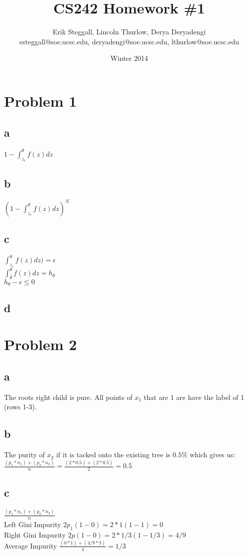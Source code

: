 \documentclass{article}
\title{CS242 Homework \#1}
\author{Erik Steggall, Lincoln Thurlow, Derya Deryadengi\\ esteggall@soe.ucsc.edu, deryadengi@soe.ucsc.edu, lthurlow@soe.ucsc.edu}
\date{Winter 2014}
\begin{document}
 \maketitle \pagestyle{empty}
\section*{Problem 1}
\subsection*{a}
$1- \int_{z_{\epsilon}}^\theta f(z) dz$\\

\subsection*{b}
$(1- \int_{z_{\epsilon}}^\theta f(z) dz)^N$\\
\subsection*{c}
$ \int_{z_{\epsilon}}^\theta f(z) dz) = \epsilon$\\
$ \int_{\hat{\theta}}^\theta f(z) dz = h_{\theta}$\\
$h_{\theta} - \epsilon \leq 0$\\
\subsection*{d}

\section*{Problem 2}
\subsection*{a}
The roots right child is pure. All points of $x_{1}$ that are 1 are have the label of 1 (rows 1-3).\\
\subsection*{b}
The purity of $x_{2}$ if it is tacked onto the existing tree is $0.5\%$ which gives us:\\
$ \frac{(p_{1}*n_{1}) + (p_{2}*n_{2})}{n} = \frac{(2*0.5) + (2*0.5)}{2} = 0.5$\\
\subsection*{c}
$ \frac{(p_{1}*n_{1}) + (p_{2}*n_{2})}{n} $\\
Left Gini Impurity $ 2p_{1}(1-0) = 2*1(1-1) = 0$\\
Right  Gini Impurity $2p(1-0) = 2*1/3(1-1/3) = 4/9$\\
Average Impurity $\frac{(0*1) + (4/9 * 3)}{4} = 1/3$ \\
\end{document}
